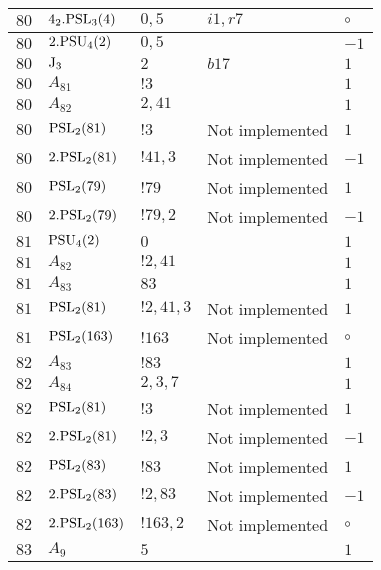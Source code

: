 \documentclass[a4paper, 11pt]{article}
\begin{document}
\begin{longtable}{lllll}
        $ 80 $ & $ 4_2.{\rm PSL}_{3}(4) $ & $ 0,5 $ & $ i1, r7 $ &  $\circ$ \\ \hline
        $ 80 $ & $ 2.{\rm PSU}_{4}(2) $ & $ 0,5 $ & $ ~ $ & $ -1$ \\ \hline
        $ 80 $ & $ {\rm J}_3 $ & $ 2 $ & $ b17 $ & $ 1$ \\ \hline
        $ 80 $ & $ A_{81} $ & $ !3 $ & $ ~ $ & $ 1$ \\ \hline
        $ 80 $ & $ A_{82} $ & $ 2, 41 $ & $ ~ $ & $ 1$ \\ \hline
        $ 80 $ & $ {\rm PSL}_{2}(81) $ & $ !3 $ &  Not implemented & $ 1$ \\ \hline
        $ 80 $ & $ 2.{\rm PSL}_{2}(81) $ & $ !41, 3 $ &  Not implemented & $ -1$ \\ \hline
        $ 80 $ & $ {\rm PSL}_{2}(79) $ & $ !79 $ &  Not implemented & $ 1$ \\ \hline
        $ 80 $ & $ 2.{\rm PSL}_{2}(79) $ & $ !79, 2 $ &  Not implemented & $ -1$ \\ \hline
        $ 81 $ & $ {\rm PSU}_{4}(2) $ & $ 0 $ & $ ~ $ & $ 1$ \\ \hline
        $ 81 $ & $ A_{82} $ & $ !2, 41 $ & $ ~ $ & $ 1$ \\ \hline
        $ 81 $ & $ A_{83} $ & $ 83 $ & $ ~ $ & $ 1$ \\ \hline
        $ 81 $ & $ {\rm PSL}_{2}(81) $ & $ !2, 41, 3 $ &  Not implemented & $ 1$ \\ \hline
        $ 81 $ & $ {\rm PSL}_{2}(163) $ & $ !163 $ &  Not implemented &  $\circ$ \\ \hline
        $ 82 $ & $ A_{83} $ & $ !83 $ & $ ~ $ & $ 1$ \\ \hline
        $ 82 $ & $ A_{84} $ & $ 2, 3, 7 $ & $ ~ $ & $ 1$ \\ \hline
        $ 82 $ & $ {\rm PSL}_{2}(81) $ & $ !3 $ &  Not implemented & $ 1$ \\ \hline
        $ 82 $ & $ 2.{\rm PSL}_{2}(81) $ & $ !2, 3 $ &  Not implemented & $ -1$ \\ \hline
        $ 82 $ & $ {\rm PSL}_{2}(83) $ & $ !83 $ &  Not implemented & $ 1$ \\ \hline
        $ 82 $ & $ 2.{\rm PSL}_{2}(83) $ & $ !2, 83 $ &  Not implemented & $ -1$ \\ \hline
        $ 82 $ & $ 2.{\rm PSL}_{2}(163) $ & $ !163, 2 $ &  Not implemented &  $\circ$ \\ \hline
        $ 83 $ & $ A_{9} $ & $ 5 $ & $ ~ $ & $ 1$ \\ \hline

\end{longtable}
\end{document}

